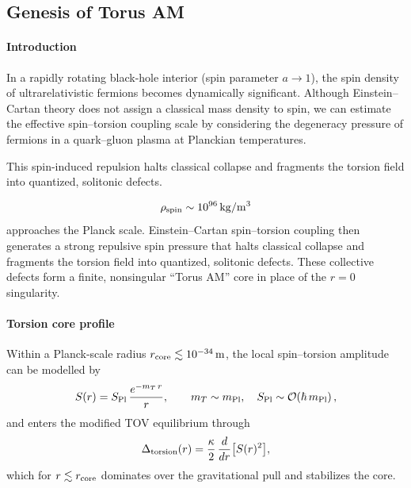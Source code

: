 \documentclass{article}
\newcommand{\Splanck}{S_{\mathrm{Pl}}}
\begin{document}
\subsection{Genesis of Torus AM}
\label{sec:genesis-torus}
\paragraph{Introduction}
In a rapidly rotating black-hole interior (spin parameter \(a \to 1\)), the spin density of ultrarelativistic fermions becomes dynamically significant. Although Einstein–Cartan theory does not assign a classical mass density to spin, we can estimate the effective spin–torsion coupling scale by considering the degeneracy pressure of fermions in a quark–gluon plasma at Planckian temperatures.

This spin-induced repulsion halts classical collapse and fragments the torsion field into quantized, solitonic defects.

\[
  \rho_{\rm spin}\sim10^{96}\,\mathrm{kg/m^3}
\]
approaches the Planck scale.  Einstein–Cartan spin–torsion coupling then generates a strong repulsive
spin pressure that halts classical collapse and fragments the torsion field into quantized, solitonic
defects.  These collective defects form a finite, nonsingular “Torus AM” core in place of the \(r=0\)
singularity.

\paragraph{Torsion core profile}
Within a Planck-scale radius \(r_{\rm core}\lesssim10^{-34}\,\mathrm m\), the local spin–torsion
amplitude can be modelled by
\begin{equation}\label{eq:S-profile}
  S(r) = \Splanck\,\frac{e^{-m_T\,r}}{r},
  \qquad
  m_T\sim m_{\rm Pl},
  \quad
  \Splanck\sim\mathcal O(\hbar\,m_{\rm Pl})\,,
\end{equation}
and enters the modified TOV equilibrium through
\begin{equation}\label{eq:Delta-torsion-core}
  \Delta_{\rm torsion}(r)
    = \frac{\kappa}{2}\,\frac{d}{dr}\bigl[S(r)^2\bigr],
\end{equation}
which for \(r\lesssim r_{\rm core}\) dominates over the gravitational pull and stabilizes the core.
\end{document}
